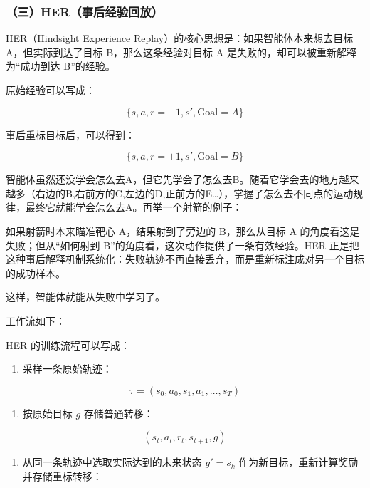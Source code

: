 \hypertarget{ux4e09herux4e8bux540eux7ecfux9a8cux56deux653e}{%
\subsubsection{（三）HER（事后经验回放）}\label{ux4e09herux4e8bux540eux7ecfux9a8cux56deux653e}}

HER（Hindsight Experience Replay）的核心思想是：如果智能体本来想去目标 A，但实际到达了目标 B，那么这条经验对目标 A 是失败的，却可以被重新解释为``成功到达 B''的经验。

原始经验可以写成：

\[
\{s,a,r=-1,s',\mathrm{Goal}=A\}
\]

事后重标目标后，可以得到：

\[
\{s,a,r=+1,s',\mathrm{Goal}=B\}
\]

智能体虽然还没学会怎么去A，但它先学会了怎么去B。随着它学会去的地方越来越多（右边的B,右前方的C,左边的D,正前方的E\ldots），掌握了怎么去不同点的运动规律，最终它就能学会怎么去A。再举一个射箭的例子：

如果射箭时本来瞄准靶心 A，结果射到了旁边的 B，那么从目标 A 的角度看这是失败；但从``如何射到 B''的角度看，这次动作提供了一条有效经验。HER 正是把这种事后解释机制系统化：失败轨迹不再直接丢弃，而是重新标注成对另一个目标的成功样本。

这样，智能体就能从失败中学习了。

工作流如下：

HER 的训练流程可以写成：

\begin{enumerate}
\def\labelenumi{\arabic{enumi}.}
\tightlist
\item
  采样一条原始轨迹：
\end{enumerate}

\[
\tau=(s_0,a_0,s_1,a_1,\ldots,s_T)
\]

\begin{enumerate}
\def\labelenumi{\arabic{enumi}.}
\setcounter{enumi}{1}
\tightlist
\item
  按原始目标 \(g\) 存储普通转移：
\end{enumerate}

\[
(s_t,a_t,r_t,s_{t+1},g)
\]

\begin{enumerate}
\def\labelenumi{\arabic{enumi}.}
\setcounter{enumi}{2}
\tightlist
\item
  从同一条轨迹中选取实际达到的未来状态 \(g'=s_k\) 作为新目标，重新计算奖励并存储重标转移：
\end{enumerate}

